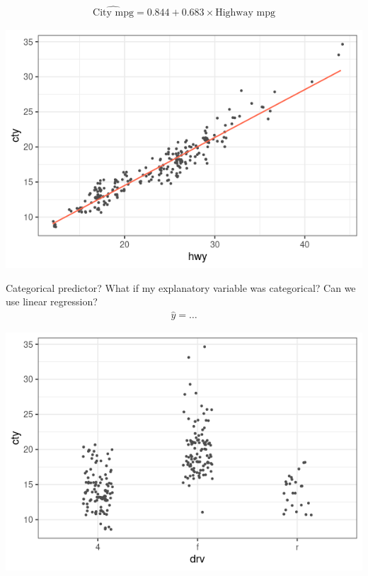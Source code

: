 \documentclass{beamer}
\begin{document}
\begin{frame}
\begin{align*}
\widehat{\text{City mpg}}  = 0.844 + 0.683 \times \text{Highway mpg}
\end{align*}
\begin{center}
\includegraphics[scale=0.5]{reg_reg2.png}
\end{center}
\end{frame}



\begin{frame}{Categorical predictor?}
What if my explanatory variable was categorical? Can we use linear regression?
\begin{align*}
\hat{y} = \dots
\end{align*}
\begin{center}
\includegraphics[scale=0.45]{cat_reg1.png}
\end{center}
\end{frame}
\end{document}
